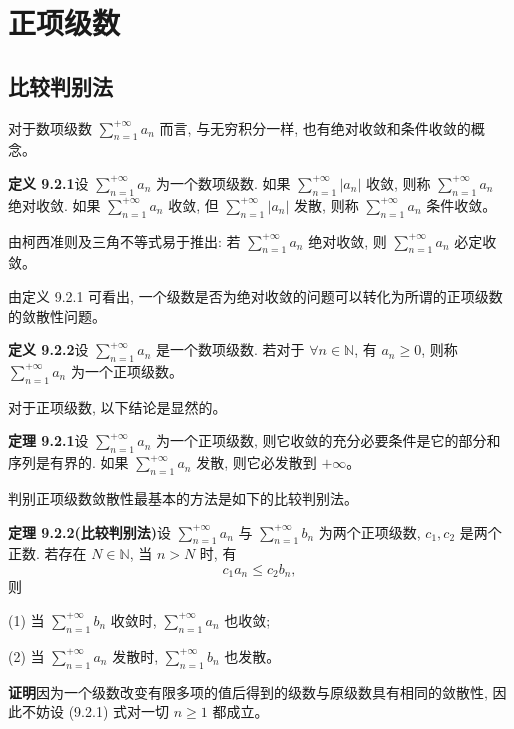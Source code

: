 \documentclass[UTF8,12pt,a4paper,fontset=fandol]{ctexart}
\begin{document}
\section{正项级数}

\subsection{比较判别法}

对于数项级数 $\sum\limits_{n=1}^{+\infty}a_n$ 而言, 与无穷积分一样, 也有绝对收敛和条件收敛的概念。

\noindent\textbf{定义 9.2.1}\quad 设 $\sum\limits_{n=1}^{+\infty}a_n$ 为一个数项级数. 如果 $\sum\limits_{n=1}^{+\infty}|a_n|$ 收敛, 则称 $\sum\limits_{n=1}^{+\infty}a_n$ 绝对收敛. 如果 $\sum\limits_{n=1}^{+\infty}a_n$ 收敛, 但 $\sum\limits_{n=1}^{+\infty}|a_n|$ 发散, 则称 $\sum\limits_{n=1}^{+\infty}a_n$ 条件收敛。

由柯西准则及三角不等式易于推出: 若 $\sum\limits_{n=1}^{+\infty}a_n$ 绝对收敛, 则 $\sum\limits_{n=1}^{+\infty}a_n$ 必定收敛。

由定义 9.2.1 可看出, 一个级数是否为绝对收敛的问题可以转化为所谓的正项级数的敛散性问题。

\noindent\textbf{定义 9.2.2}\quad 设 $\sum\limits_{n=1}^{+\infty}a_n$ 是一个数项级数. 若对于 $\forall n\in\mathbb N$, 有 $a_n\geq0$, 则称 $\sum\limits_{n=1}^{+\infty}a_n$ 为一个正项级数。

对于正项级数, 以下结论是显然的。

\noindent\textbf{定理 9.2.1}\quad 设 $\sum\limits_{n=1}^{+\infty}a_n$ 为一个正项级数, 则它收敛的充分必要条件是它的部分和序列是有界的. 如果 $\sum\limits_{n=1}^{+\infty}a_n$ 发散, 则它必发散到 $+\infty$。

判别正项级数敛散性最基本的方法是如下的比较判别法。

\noindent\textbf{定理 9.2.2(比较判别法)}\quad 设 $\sum\limits_{n=1}^{+\infty}a_n$ 与 $\sum\limits_{n=1}^{+\infty}b_n$ 为两个正项级数, $c_1,c_2$ 是两个正数. 若存在 $N\in\mathbb N$, 当 $n>N$ 时, 有
\begin{equation}
  c_1a_n\leq c_2b_n,
  \tag{9.2.1}
\end{equation}
则

(1) 当 $\sum\limits_{n=1}^{+\infty}b_n$ 收敛时, $\sum\limits_{n=1}^{+\infty}a_n$ 也收敛;

(2) 当 $\sum\limits_{n=1}^{+\infty}a_n$ 发散时, $\sum\limits_{n=1}^{+\infty}b_n$ 也发散。

\noindent\textbf{证明}\quad 因为一个级数改变有限多项的值后得到的级数与原级数具有相同的敛散性, 因此不妨设 (9.2.1) 式对一切 $n\geq1$ 都成立。
\end{document}
